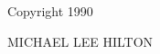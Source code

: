 \clearpage
\setcounter{page}{1}
\thispagestyle{plain}

\vspace*{3.2in}

\begin{center}
Copyright 1990

\vspace{0.25in}

MICHAEL LEE HILTON
\end{center}

